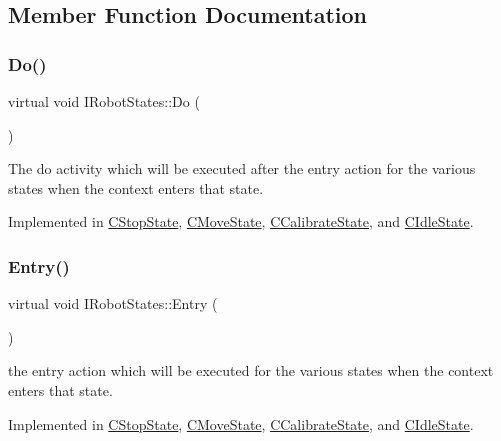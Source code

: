 \subsection{Member Function Documentation}
\mbox{\label{classIRobotStates_aa681381e72738a2870c3f13f552a2e93}} 
\subsubsection{\texorpdfstring{Do()}{Do()}}
{\footnotesize\ttfamily virtual void I\+Robot\+States\+::\+Do (\begin{DoxyParamCaption}{ }\end{DoxyParamCaption})\hspace{0.3cm}{\ttfamily [pure virtual]}}



The do activity which will be executed after the entry action for the various states when the context enters that state. 



Implemented in \hyperlink{classCStopState_aba51445ef29e03fa5ffc5cef48923a10}{C\+Stop\+State}, \hyperlink{classCMoveState_acd364df1357b25ee616a7444116cf9f6}{C\+Move\+State}, \hyperlink{classCCalibrateState_a2b2ad369ae655704fadcffb0a4b9fca2}{C\+Calibrate\+State}, and \hyperlink{classCIdleState_a7ae1fe9a96dfb78faaebd068bb8ecae7}{C\+Idle\+State}.

\mbox{\label{classIRobotStates_af43ddb52f5100b42c3d11b71fb1f10dd}} 
\subsubsection{\texorpdfstring{Entry()}{Entry()}}
{\footnotesize\ttfamily virtual void I\+Robot\+States\+::\+Entry (\begin{DoxyParamCaption}{ }\end{DoxyParamCaption})\hspace{0.3cm}{\ttfamily [pure virtual]}}



the entry action which will be executed for the various states when the context enters that state. 



Implemented in \hyperlink{classCStopState_aae7dbdb7db312f20a16fcd48edc60e83}{C\+Stop\+State}, \hyperlink{classCMoveState_ae9bda8d64d42c16e19facdfa8eb842e2}{C\+Move\+State}, \hyperlink{classCCalibrateState_a361368643bad182ed1a78ee1d1a820e5}{C\+Calibrate\+State}, and \hyperlink{classCIdleState_afcfc7e601c50b99c27380b9541fc3795}{C\+Idle\+State}.

